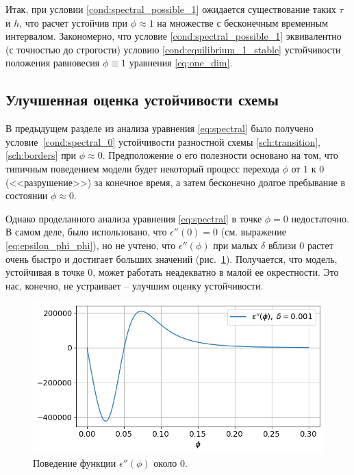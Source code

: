 Итак, при условии \eqref{cond:spectral_possible_1} ожидается существование таких $\tau$ и $h$, что расчет устойчив при $\phi \approx 1$ на множестве с бесконечным временным интервалом. Закономерно, что условие \eqref{cond:spectral_possible_1} эквивалентно (с точностью до строгости) условию \eqref{cond:equilibrium_1_stable} устойчивости положения равновесия $\phi \equiv 1$ уравнения \eqref{eq:one_dim}.


\subsection{Улучшенная оценка устойчивости схемы}

В предыдущем разделе из анализа уравнения \eqref{eq:spectral} было получено условие~\eqref{cond:spectral_0} устойчивости разностной схемы \eqref{sch:transition}, \eqref{sch:borders} при $\phi \approx 0$. Предположение о его полезности основано на том, что типичным поведением модели будет некоторый процесс перехода $\phi$ от $1$ к $0$ (<<разрушение>>) за конечное время, а затем бесконечно долгое пребывание в состоянии $\phi \approx 0$.

Однако проделанного анализа уравнения \eqref{eq:spectral} в точке $\phi = 0$ недостаточно. В самом деле, было использовано, что $\epsilon''(0) = 0$ (см. выражение \eqref{eq:epsilon_phi_phi}), но не учтено, что $\epsilon''(\phi)$ при малых $\delta$ вблизи $0$ растет очень быстро и достигает больших значений (рис.~\ref{fig:eps_phi_phi}). Получается, что модель, устойчивая в точке $0$, может работать неадекватно в малой ее окрестности. Это нас, конечно, не устраивает -- улучшим оценку устойчивости.

\begin{figure}[!tp]
	\centering
	\includegraphics[width=\textwidth]{figures/eps_phi_phi.png}
	\vspace{-0.7cm}
	\caption{Поведение функции $\epsilon''(\phi)$ около $0$.}
	\label{fig:eps_phi_phi}
\end{figure}

